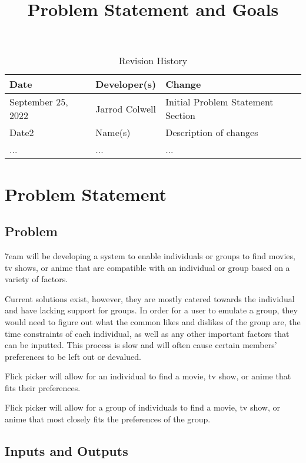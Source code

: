 \documentclass{article}
\title{Problem Statement and Goals\\\progname}
\author{\authname}
\date{}
\begin{document}
\maketitle

\begin{table}[hp]
\caption{Revision History} \label{TblRevisionHistory}
\begin{tabularx}{\textwidth}{llX}
\toprule
\textbf{Date} & \textbf{Developer(s)} & \textbf{Change}\\
\midrule
September 25, 2022 & Jarrod Colwell & Initial Problem Statement Section\\
Date2 & Name(s) & Description of changes\\
... & ... & ...\\
\bottomrule
\end{tabularx}
\end{table}

\section{Problem Statement}

\subsection{Problem}

7eam will be developing a system to enable individuals or groups to find movies, tv shows, or anime that are compatible with an individual or group based on a variety of factors.

Current solutions exist, however, they are mostly catered towards the individual and have lacking support for groups. In order for a user to emulate a group, they would need to figure out what the common likes and dislikes of the group are, the time constraints of each individual, as well as any other important factors that can be inputted. This process is slow and will often cause certain members' preferences to be left out or devalued. 

Flick picker will allow for an individual to find a movie, tv show, or anime that fits their preferences.

Flick picker will allow for a group of individuals to find a movie, tv show, or anime that most closely fits the preferences of the group.


\subsection{Inputs and Outputs}
\end{document}
